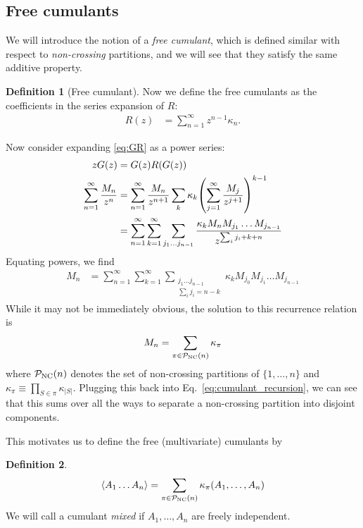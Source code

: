 \documentclass[11pt]{article}
\theoremstyle{definition}
\newtheorem{definition}{Definition}[section]
\begin{document}
\subsection{Free cumulants}
We will introduce the notion of a \emph{free cumulant}, which is defined similar with respect to \emph{non-crossing} partitions, and we will see that they satisfy the same additive property.

\begin{definition}[Free cumulant]
Now we define the free cumulants as the coefficients in the series expansion of $R$:
\begin{align}
R(z) &= \sum_{n=1}^\infty z^{n-1} \kappa_n.
\end{align}
\end{definition}
Now consider expanding \eqref{eq:GR} as a power series:
\begin{align}
zG(z) &= G(z)R(G(z)) \\
\sum_{n = 1}^\infty \frac{M_n}{z^n} &= \sum_{n=1}^\infty \frac{M_n}{z^{n+1}}\sum_{k}\kappa_k\qty(\sum_{j = 1}^\infty \frac{M_j}{z^{j+1}})^{k-1} \notag \\
&= \sum_{n=1}^\infty\sum_{k=1}^\infty\sum_{j_1\ldots j_{n-1}} \frac{\kappa_k M_n M_{j_1}\ldots M_{j_{n-1}}}{z^{\sum_i j_i + k+n}}
\end{align}
Equating powers, we find
\begin{align}
M_n &= \sum_{n=1}^\infty\sum_{k=1}^\infty\sum_{\substack{j_1\ldots j_{n-1} \\ \sum_ij_i = n-k}} \kappa_k M_{j_0} M_{j_1}\ldots M_{j_{n-1}} \label{eq:cumulant_recursion}
\end{align}
While it may not be immediately obvious, the solution to this recurrence relation is
\begin{align}
M_n = \sum_{\pi \in \mathcal P_{\rm{NC}}(n)}\kappa_{\pi}
\end{align}
where $\mathcal P_{\rm{NC}}(n)$ denotes the set of non-crossing partitions of $\{1, \ldots, n\}$ and $\kappa_\pi \equiv \prod_{S \in \pi}\kappa_{|S|}$. Plugging this back into Eq.~\eqref{eq:cumulant_recursion}, we can see that this sums over all the ways to separate a non-crossing partition into disjoint components.

This motivates us to define the free (multivariate) cumulants by
\begin{definition}
\begin{align}
\langle A_1\ldots A_n \rangle  = \sum_{\pi \in \mathcal P_{\rm{NC}}(n)}\kappa_{\pi}(A_1, \ldots, A_n)
\end{align}
We will call a cumulant \emph{mixed} if $A_1, \ldots, A_n$ are freely independent.
\end{definition}
\end{document}
